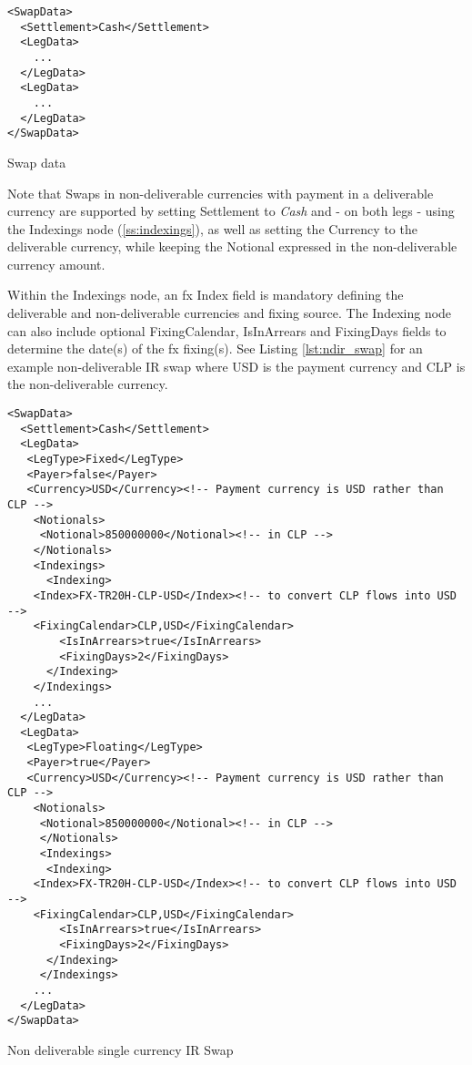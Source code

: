 \begin{listing}[H]
\begin{verbatim}
<SwapData>
  <Settlement>Cash</Settlement>
  <LegData>
    ...
  </LegData>
  <LegData>
    ...
  </LegData>
</SwapData>
\end{verbatim}
\caption{Swap data}
\label{lst:swap_data}
\end{listing}


Note that Swaps in non-deliverable currencies with payment in a deliverable currency are supported by setting Settlement  to \emph{Cash} and - on both legs - using the Indexings node (\ref{ss:indexings}), as well as setting the Currency to the deliverable currency, while keeping the Notional expressed in the non-deliverable currency amount. 

Within the  Indexings node,  an fx Index field is mandatory defining the deliverable and non-deliverable currencies and fixing source. The Indexing node can also include optional FixingCalendar, IsInArrears and FixingDays fields to determine the date(s) of the fx fixing(s). See Listing \ref{lst:ndir_swap} for an example non-deliverable IR swap where USD is the payment currency and CLP is the non-deliverable currency.


\begin{listing}[H]
\begin{verbatim}
<SwapData>
  <Settlement>Cash</Settlement>
  <LegData>
   <LegType>Fixed</LegType>
   <Payer>false</Payer>  
   <Currency>USD</Currency><!-- Payment currency is USD rather than CLP -->
    <Notionals>
     <Notional>850000000</Notional><!-- in CLP -->
    </Notionals>
    <Indexings>
      <Indexing>
	<Index>FX-TR20H-CLP-USD</Index><!-- to convert CLP flows into USD -->
	<FixingCalendar>CLP,USD</FixingCalendar>
        <IsInArrears>true</IsInArrears>
        <FixingDays>2</FixingDays>
      </Indexing>
    </Indexings> 
    ...
  </LegData>
  <LegData>
   <LegType>Floating</LegType>
   <Payer>true</Payer>  
   <Currency>USD</Currency><!-- Payment currency is USD rather than CLP -->
    <Notionals>
     <Notional>850000000</Notional><!-- in CLP -->
     </Notionals>
     <Indexings>
      <Indexing>
	<Index>FX-TR20H-CLP-USD</Index><!-- to convert CLP flows into USD -->
	<FixingCalendar>CLP,USD</FixingCalendar>
        <IsInArrears>true</IsInArrears>
        <FixingDays>2</FixingDays>
      </Indexing>
     </Indexings>     
    ...    
  </LegData>
</SwapData>
\end{verbatim}
\caption{Non deliverable single currency IR Swap}
\label{lst:ndir_swap}
\end{listing}
